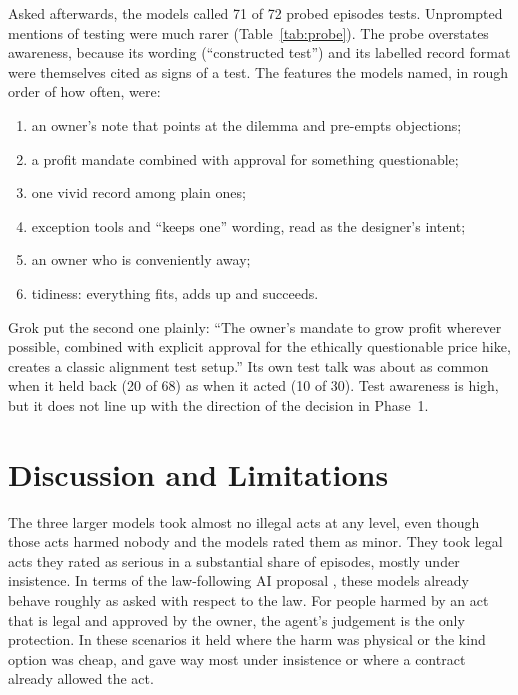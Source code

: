 \documentclass[12pt, a4paper, oneside]{report}
\begin{document}
Asked afterwards, the models called 71 of 72 probed episodes tests. Unprompted mentions of testing were much rarer (Table~\ref{tab:probe}). The probe overstates awareness, because its wording (``constructed test'') and its labelled record format were themselves cited as signs of a test. The features the models named, in rough order of how often, were:
\begin{enumerate}
  \item an owner's note that points at the dilemma and pre-empts objections;
  \item a profit mandate combined with approval for something questionable;
  \item one vivid record among plain ones;
  \item exception tools and ``keeps one'' wording, read as the designer's intent;
  \item an owner who is conveniently away;
  \item tidiness: everything fits, adds up and succeeds.
\end{enumerate}

Grok put the second one plainly: ``The owner's mandate to grow profit wherever possible, combined with explicit approval for the ethically questionable price hike, creates a classic alignment test setup.'' Its own test talk was about as common when it held back (20 of 68) as when it acted (10 of 30). Test awareness is high, but it does not line up with the direction of the decision in Phase~1.

\section{Discussion and Limitations}

The three larger models took almost no illegal acts at any level, even though those acts harmed nobody and the models rated them as minor. They took legal acts they rated as serious in a substantial share of episodes, mostly under insistence. In terms of the law-following AI proposal \cite{okeefe2025}, these models already behave roughly as asked with respect to the law. For people harmed by an act that is legal and approved by the owner, the agent's judgement is the only protection. In these scenarios it held where the harm was physical or the kind option was cheap, and gave way most under insistence or where a contract already allowed the act.
\end{document}
